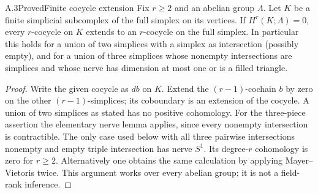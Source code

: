\begin{claim}{A.3}{Proved}{Finite cocycle extension}\label{A:cocycle-extension}
Fix $r\geq2$ and an abelian group $\Lambda$. Let $K$ be a finite simplicial subcomplex of the full simplex on its vertices. If $H^r(K;\Lambda)=0$, every $r$-cocycle on $K$ extends to an $r$-cocycle on the full simplex. In particular this holds for a union of two simplices with a simplex as intersection (possibly empty), and for a union of three simplices whose nonempty intersections are simplices and whose nerve has dimension at most one or is a filled triangle.
\end{claim}
\begin{proof}
Write the given cocycle as $d b$ on $K$. Extend the $(r-1)$-cochain $b$ by zero on the other $(r-1)$-simplices; its coboundary is an extension of the cocycle. A union of two simplices as stated has no positive cohomology. For the three-piece assertion the elementary nerve lemma applies, since every nonempty intersection is contractible. The only case used below with all three pairwise intersections nonempty and empty triple intersection has nerve $S^1$. Its degree-$r$ cohomology is zero for $r\geq2$. Alternatively one obtains the same calculation by applying Mayer--Vietoris twice. This argument works over every abelian group; it is not a field-rank inference.
\end{proof}

